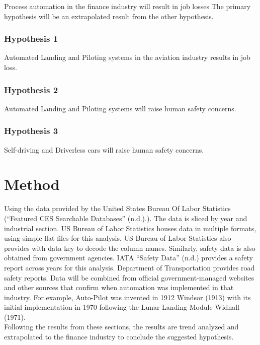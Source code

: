 \documentclass[
  english,
  man]{apa7}
\begin{document}
Process automation in the finance industry will result in job losses
The primary hypothesis will be an extrapolated result from the other hypothesis.

\hypertarget{hypothesis-1}{%
\subsubsection{Hypothesis 1}\label{hypothesis-1}}

Automated Landing and Piloting systems in the aviation industry results in job loss.

\hypertarget{hypothesis-2}{%
\subsubsection{Hypothesis 2}\label{hypothesis-2}}

Automated Landing and Piloting systems will raise human safety concerns.

\hypertarget{hypothesis-3}{%
\subsubsection{Hypothesis 3}\label{hypothesis-3}}

Self-driving and Driverless cars will raise human safety concerns.

\hypertarget{method}{%
\section{Method}\label{method}}

Using the data provided by the United States Bureau Of Labor Statistics ({``Featured CES Searchable Databases''} (n.d.).). The data is sliced by year and industrial section. US Bureau of Labor Statistics houses data in multiple formats, using simple flat files for this analysis. US Bureau of Labor Statistics also provides with data key to decode the column names. Similarly, safety data is also obtained from government agencies. IATA {``Safety Data''} (n.d.) provides a safety report across years for this analysis. Department of Transportation provides road safety reports. Data will be combined from official government-managed websites and other sources that confirm when automation was implemented in that industry. For example, Auto-Pilot was invented in 1912 Windsor (1913) with its initial implementation in 1970 following the Lunar Landing Module Widnall (1971).\\
Following the results from these sections, the results are trend analyzed and extrapolated to the finance industry to conclude the suggested hypothesis.
\end{document}
